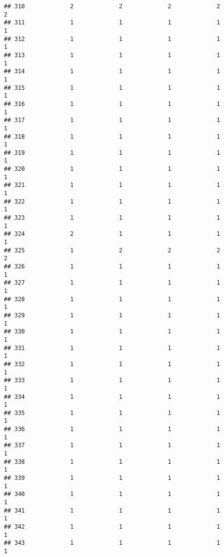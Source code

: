 \documentclass[
]{article}
\begin{document}
\begin{verbatim}
## 310             2             2             2             2             2
## 311             1             1             1             1             1
## 312             1             1             1             1             1
## 313             1             1             1             1             1
## 314             1             1             1             1             1
## 315             1             1             1             1             1
## 316             1             1             1             1             1
## 317             1             1             1             1             1
## 318             1             1             1             1             1
## 319             1             1             1             1             1
## 320             1             1             1             1             1
## 321             1             1             1             1             1
## 322             1             1             1             1             1
## 323             1             1             1             1             1
## 324             2             1             1             1             1
## 325             1             2             2             2             2
## 326             1             1             1             1             1
## 327             1             1             1             1             1
## 328             1             1             1             1             1
## 329             1             1             1             1             1
## 330             1             1             1             1             1
## 331             1             1             1             1             1
## 332             1             1             1             1             1
## 333             1             1             1             1             1
## 334             1             1             1             1             1
## 335             1             1             1             1             1
## 336             1             1             1             1             1
## 337             1             1             1             1             1
## 338             1             1             1             1             1
## 339             1             1             1             1             1
## 340             1             1             1             1             1
## 341             1             1             1             1             1
## 342             1             1             1             1             1
## 343             1             1             1             1             1

\end{verbatim}
\end{document}
